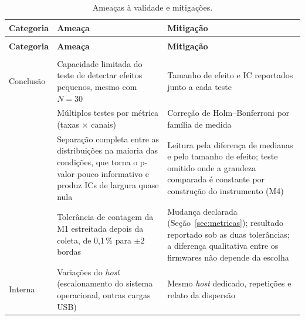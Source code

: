 {\small
\def\LTcaptype{quadro}
\setlength{\LTpost}{0pt}
\begin{xltabular}{\linewidth}{|>{\raggedright\arraybackslash}p{2.0cm}|>{\raggedright\arraybackslash}X|>{\raggedright\arraybackslash}X|}
  \caption{Ameaças à validade e mitigações.}
  \label{qua:ameacas} \\
    \hline
    \textbf{Categoria} & \textbf{Ameaça}                                                                                    & \textbf{Mitigação} \\ \hline
  \endfirsthead
     \\ \hline
    \textbf{Categoria} & \textbf{Ameaça}                                                                                    & \textbf{Mitigação} \\ \hline
  \endhead
    \hline {} \\
  \endfoot
  \endlastfoot
    Conclusão          & Capacidade limitada do teste de detectar efeitos pequenos, mesmo com $N = 30$ \cite{cohen1988}
                       & Tamanho de efeito e \acs{IC} reportados junto a cada teste                                                              \\ 
                       & Múltiplos testes por métrica (taxas $\times$ canais)
                       & Correção de Holm--Bonferroni por família de medida                                                                      \\ 
                       & Separação completa entre as distribuições na maioria das condições, que torna o p-valor pouco informativo e produz \acsp{IC} de largura quase nula
                       & Leitura pela diferença de medianas e pelo tamanho de efeito; teste omitido onde a grandeza comparada é constante por construção do instrumento (M4) \\ 
                       & Tolerância de contagem da M1 estreitada depois da coleta, de 0,1\,\% para $\pm 2$ bordas
                       & Mudança declarada (Seção~\ref{sec:metricas}); resultado reportado sob as duas tolerâncias; a diferença qualitativa entre os firmwares não depende da escolha \\ \hline
    Interna            & Variações do \emph{host} (escalonamento do sistema operacional, outras cargas \acs{USB})
                       & Mesmo \emph{host} dedicado, repetições e relato da dispersão                                                                   \\ 

\end{xltabular}}
